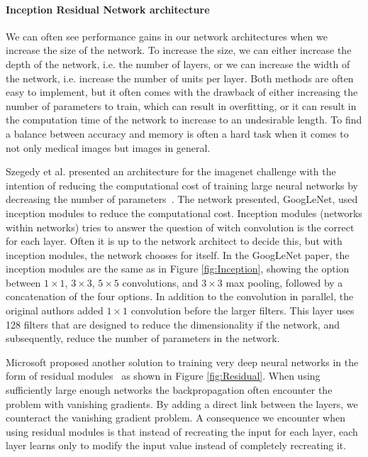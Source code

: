 \paragraph{Inception Residual Network architecture }
We can often see performance gains in our network architectures when we increase the size of the network. To increase the size, we can either increase the depth of the network, i.e. the number of layers, or we can increase the width of the network, i.e. increase the number of units per layer. Both methods are often easy to implement, but it often comes with the drawback of either increasing the number of parameters to train, which can result in overfitting, or it can result in the computation time of the network to increase to an undesirable length.
To find a balance between accuracy and memory is often a hard task when it comes to not only medical images but images in general.

Szegedy et al. presented an architecture for the imagenet challenge with the intention of reducing the computational cost of training large neural networks by decreasing the number of parameters~\cite{DBLP:journals/corr/SzegedyLJSRAEVR14}. 
The network presented, GoogLeNet, used inception modules to reduce the computational cost.  Inception modules (networks within networks) tries to answer the question of witch convolution is the correct for each layer. Often it is up to the network architect to decide this, but with inception modules, the network chooses for itself. 
In the GoogLeNet paper, the inception modules are the same as in Figure \ref{fig:Inception}, showing the option between $1 \times 1$, $3 \times 3$, $5 \times 5$ convolutions, and $3 \times 3$ max pooling, followed by a concatenation of the four options. In addition to the convolution in parallel, the original authors added $1 \times 1$ convolution before the larger filters. This layer uses 128 filters that are designed to reduce the dimensionality if the network, and subsequently, reduce the number of parameters in the network.


Microsoft proposed another solution to training very deep neural networks in the form of residual modules~\cite{DBLP:journals/corr/HeZRS15} as shown in Figure \ref{fig:Residual}.
When using sufficiently large enough networks the backpropagation often encounter the problem with vanishing gradients. By adding a direct link between the layers, we counteract the vanishing gradient problem. A consequence we encounter when using residual modules is that instead of recreating the input for each layer, each layer learns only to modify the input value instead of completely recreating it.


